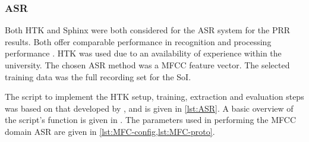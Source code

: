 \subsubsection*{\acl{ASR}}

Both \ac{HTK} and Sphinx were both considered for the \ac{ASR} system
for the \ac{PRR} results. Both offer comparable performance in recognition
and processing performance \citep{Vertanen2006}. \ac{HTK} was used
due to an availability of experience within the university. The chosen
\ac{ASR} method was a \ac{MFCC} feature vector. The selected training
data was the full recording set for the \ac{SoI}.

The script to implement the \ac{HTK} setup, training, extraction
and evaluation steps was based on that developed by \citet{Quill2014},
and is given in \ref{lst:ASR}. A basic overview of the script's function
is given in . The parameters used in performing the \ac{MFCC}
domain \ac{ASR} are given in \cref{lst:MFC-config,lst:MFC-proto}.

